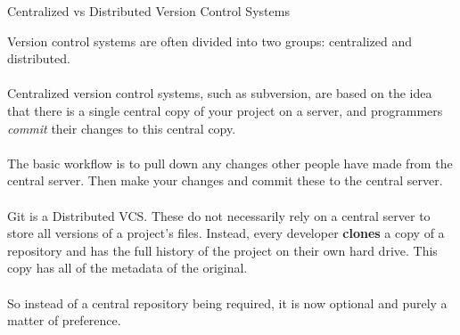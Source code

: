 \documentclass[10pt]{beamer}
\begin{document}
\begin{frame}[fragile]{Centralized vs Distributed Version Control Systems}

Version control systems are often divided into two groups: centralized and distributed.\\~\\

Centralized version control systems, such as subversion, are based on the idea that there is a single central copy of your project on a server, and programmers \emph{commit} their changes to this central copy.\\~\\

The basic workflow is to pull down any changes other people have made from the central server. Then make your changes and commit these to the central server.\\~\\

Git is a Distributed VCS. These do not necessarily rely on a central server to store all versions of a project's files. Instead, every developer \textbf{clones} a copy of a repository and has the full history of the project on their own hard drive. This copy has all of the metadata of the original.\\~\\

So instead of a central repository being required, it is now optional and purely a matter of preference.\\~\\





\end{frame}
\end{document}
